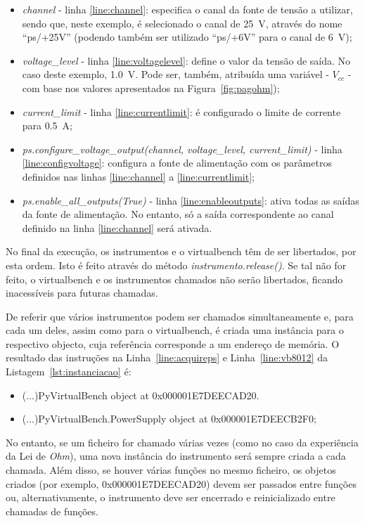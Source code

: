 \begin{itemize}
	\item \textit{channel} - linha \ref{line:channel}: especifica o canal da fonte de tensão a utilizar, sendo que, neste exemplo, é selecionado o canal de \SI{25}{\volt}, através do nome ``ps/+25V'' (podendo também ser utilizado ``ps/+6V'' para o canal de \SI{6}{\volt});
	\item \textit{voltage\_level} - linha \ref{line:voltagelevel}: define o valor da tensão de saída. No caso deste exemplo, \SI{1.0}{\volt}. Pode ser, também, atribuída uma variável - $V_{cc}$ - com base nos valores apresentados na Figura~\ref{fig:pagohm});
	\item  \textit{current\_limit} - linha \ref{line:currentlimit}: é configurado o limite de corrente para \SI{0.5}{\ampere};
	\item \textit{ps.configure\_voltage\_output(channel, voltage\_level, current\_limit)} - linha \ref{line:configvoltage}: configura a fonte de alimentação com os parâmetros definidos nas linhas \ref{line:channel} a \ref{line:currentlimit};
	\item \textit{ps.enable\_all\_outputs(True)} - linha \ref{line:enableoutputs}: ativa todas as saídas da fonte de alimentação. No entanto, só a saída correspondente ao canal definido na linha \ref{line:channel} será ativada.
\end{itemize}

No final da execução, os instrumentos e o \acrshort{virtualbench} têm de ser libertados, por esta ordem. Isto é feito através do método \textit{instrumento.release()}. Se tal não for feito, o \acrshort{virtualbench} e os instrumentos chamados não serão libertados, ficando inacessíveis para futuras chamadas. 

De referir que vários instrumentos podem ser chamados simultaneamente e, para cada um deles, assim como para o \acrshort{virtualbench}, é criada uma instância para o respectivo objecto, cuja referência corresponde a um endereço de memória. O resultado das instruções na Linha~\ref{line:acquireps} e Linha~\ref{line:vb8012} da Listagem~\ref{lst:instanciacao} é:

\begin{itemize}
	\item (...)PyVirtualBench object at 0x000001E7DEECAD20.
	\item (...)PyVirtualBench.PowerSupply object at 0x000001E7DEECB2F0;
\end{itemize}

No entanto, se um ficheiro for chamado várias vezes (como no caso da experiência da Lei de \textit{Ohm}), uma nova instância do instrumento será sempre criada a cada chamada. Além disso, se houver várias funções no mesmo ficheiro, os objetos criados (por exemplo, 0x000001E7DEECAD20) devem ser passados entre funções ou, alternativamente, o instrumento deve ser encerrado e reinicializado entre chamadas de funções.

